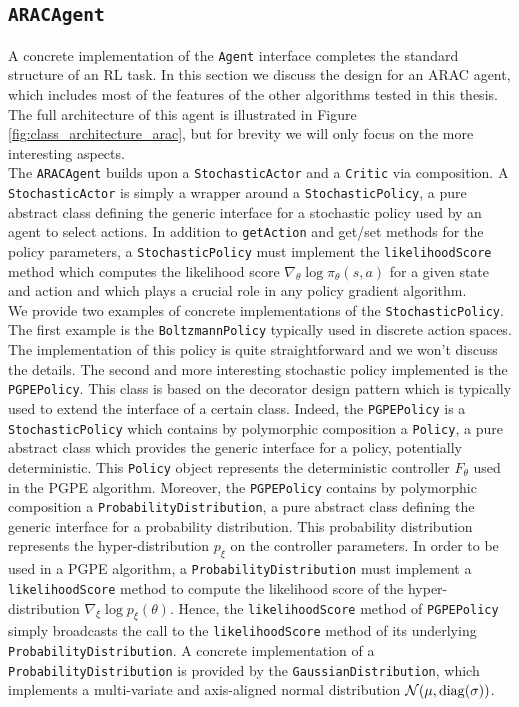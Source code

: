 \subsection{\lstinline{ARACAgent}}
A concrete implementation of the \lstinline{Agent} interface completes the standard structure of an \gls{RL} task. In this section we discuss the design for an \gls{ARAC} agent, which includes most of the features of the other algorithms tested in this thesis. The full architecture of this agent is illustrated in Figure \ref{fig:class_architecture_arac}, but for brevity we will only focus on the more interesting aspects.\\
The \lstinline{ARACAgent} builds upon a \lstinline{StochasticActor} and a \lstinline{Critic} via composition. A \lstinline{StochasticActor} is simply a wrapper around a \lstinline{StochasticPolicy}, a pure abstract class defining the generic interface for a stochastic policy used by an agent to select actions. In addition to \lstinline{getAction} and get/set methods for the policy parameters, a \lstinline{StochasticPolicy} must implement the \lstinline{likelihoodScore} method which computes the likelihood score $\nabla_\theta \log \pi_\theta(s,a)$ for a given state and action and which plays a crucial role in any policy gradient algorithm.\\
We provide two examples of concrete implementations of the \lstinline{StochasticPolicy}. The first example is the \lstinline{BoltzmannPolicy} typically used in discrete action spaces. The implementation of this policy is quite straightforward and we won't discuss the details. The second and more interesting stochastic policy implemented is the \lstinline{PGPEPolicy}. This class is based on the decorator design pattern which is typically used to extend the interface of a certain class. Indeed, the \lstinline{PGPEPolicy} is a \lstinline{StochasticPolicy} which contains by polymorphic composition a \lstinline{Policy}, a pure abstract class which provides the generic interface for a policy, potentially deterministic. This \lstinline{Policy} object represents the deterministic controller $F_\theta$ used in the \gls{PGPE} algorithm. Moreover, the \lstinline{PGPEPolicy} contains by polymorphic composition a \lstinline{ProbabilityDistribution}, a pure abstract class defining the generic interface for a probability distribution. This probability distribution represents the hyper-distribution $p_\xi$ on the controller parameters. In order to be used in a \gls{PGPE} algorithm, a \lstinline{ProbabilityDistribution} must implement a \lstinline{likelihoodScore} method to compute the likelihood score of the hyper-distribution $\nabla_\xi \log p_\xi(\theta)$. Hence, the \lstinline{likelihoodScore} method of \lstinline{PGPEPolicy} simply broadcasts the call to the \lstinline{likelihoodScore} method of its underlying \lstinline{ProbabilityDistribution}. A concrete implementation of a \lstinline{ProbabilityDistribution} is provided by the \lstinline{GaussianDistribution}, which implements a multi-variate and axis-aligned normal distribution $\mathcal{N}(\mu, \operatorname{diag}(\sigma))$.\\
